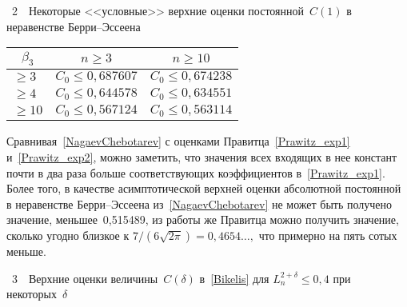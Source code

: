 \begin{multicols}{2}
\vspace*{12pt}
\noindent %
\begin{center}
\parbox{62mm}{{\tablename~2}\ \ \small{Некоторые <<условные>> верхние
оценки постоянной~$C(1)$ в неравенстве Берри--Эссеена}}
\end{center}
\vspace*{-6pt}

{\small
\begin{center}
\tabcolsep=7pt
\begin{tabular}{|l|c|c|}
\hline
\multicolumn{1}{|c|}{$\beta_3$}  & $n\ge3$ & $n\ge10$ \\
  \hline
$\ge3 $&$ C_0\le0{,}687607$ &$ C_0\le0{,}674238$ \\
$\ge4 $& $C_0\le0{,}644578 $& $C_0\le0{,}634551 $\\
 $\ge10$ & $C_0\le0{,}567124$ & $C_0\le0{,}563114$ \\
  \hline
\end{tabular}
\end{center}
}
\vspace*{6pt}


\bigskip
\addtocounter{table}{1}

Сравнивая~\eqref{NagaevChebotarev} с оценками
Правитца~\eqref{Prawitz_exp1} и~\eqref{Prawitz_exp2}, можно
заметить, что значения всех входящих в нее констант почти в два раза
больше со\-от\-вет\-ст\-ву\-ющих коэффициентов в~\eqref{Prawitz_exp1}. Более
того, в качестве асимптотической верхней оценки абсолютной
постоянной в неравенстве Берри--Эссеена из~\eqref{NagaevChebotarev}
не может быть получено значение, меньшее~0,515489, из работы же
Правитца можно получить значение, сколько угодно близкое к
$7/(6\sqrt{2\pi})=0{,}4654\ldots,$ что примерно на пять сотых меньше.

\noindent %
\begin{center}
\parbox{37mm}{{\tablename~3}\ \ \small{Верхние оценки величины~$C(\delta)$ в~\eqref{Bikelis}
для $L_n^{2+\delta}\le0{,}4$ при некоторых~$\delta$}}
\end{center}
\vspace*{-6pt}


\end{multicols}
